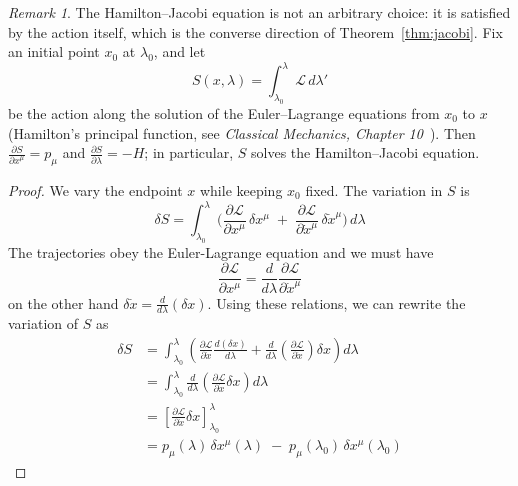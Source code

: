 \documentclass{article}
\theoremstyle{remark}
\newtheorem*{remark}{Remark}
\begin{document}
\begin{remark}
    The Hamilton--Jacobi equation is not an arbitrary choice: it is satisfied by the action itself, which is the converse direction of Theorem~\ref{thm:jacobi}. Fix an initial point $x_0$ at $\lambda_0$, and let
    \begin{equation}
        S(x,\lambda)=\int_{\lambda_0}^{\lambda} \mathcal{L}\,d\lambda'
    \end{equation}
    be the action along the solution of the Euler--Lagrange equations from $x_0$ to $x$ (Hamilton's principal function, see \emph{Classical Mechanics, Chapter 10}~\cite{goldstein}). Then $\frac{\partial S}{\partial x^{\mu}} = p_{\mu}$ and $\frac{\partial S}{\partial \lambda} = -H$; in particular, $S$ solves the Hamilton--Jacobi equation.
\end{remark}
\begin{proof}
    We vary the endpoint $x$ while keeping $x_0$ fixed. The variation in $S$ is
    \begin{equation}
        \delta S 
        = 
        \int_{\lambda_0}^{\lambda} 
        \biggl(
           \frac{\partial \mathcal{L}}{\partial x^\mu}\,\delta x^\mu
           \;+\;
           \frac{\partial \mathcal{L}}{\partial \dot{x}^\mu}\,\delta \dot{x}^\mu
        \biggr)
        \,d\lambda
    \end{equation}
    The trajectories obey the Euler-Lagrange equation and we must have
    \begin{equation}
        \frac{\partial \mathcal{L}}{\partial x^{\mu}} = \frac{d}{d\lambda}\frac{\partial \mathcal{L}}{\partial \dot{x}^{\mu}}
    \end{equation}
    on the other hand $\delta \dot{x} = \frac{d}{d\lambda}(\delta x)$. Using these relations, we can rewrite the variation of $S$ as
    \begin{align}
        \delta S &= \int_{\lambda_0}^{\lambda} \left(\frac{\partial \mathcal{L}}{\partial \dot{x}}\frac{d(\delta x)}{d\lambda} + \frac{d}{d\lambda}(\frac{\partial \mathcal{L}}{\partial \dot{x}})\delta x\right)d\lambda \\
        &= \int_{\lambda_0}^{\lambda}\frac{d}{d\lambda}\left( \frac{\partial \mathcal{L}}{\partial \dot{x}}\delta x\right)d\lambda\\
        &= \left[\frac{\partial \mathcal{L}}{\partial \dot{x}}\delta x \right]_{\lambda_0}^{\lambda}\\
        &= p_\mu(\lambda)\,\delta x^\mu(\lambda)
          \;-\;
          p_\mu(\lambda_0)\,\delta x^\mu(\lambda_0)
    \end{align}

\end{proof}
\end{document}
